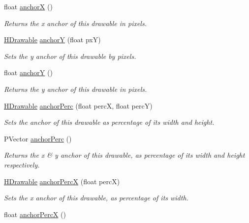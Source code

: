 \begin{DoxyCompactItemize}
float \hyperlink{classhype_1_1drawable_1_1_h_drawable_a5eaf9532fac11c32781e75c0c5c10912}{anchor\-X} ()
\begin{DoxyCompactList}\small\item\em Returns the x anchor of this drawable in pixels. \end{DoxyCompactList}\item 
\hyperlink{classhype_1_1drawable_1_1_h_drawable}{H\-Drawable} \hyperlink{classhype_1_1drawable_1_1_h_drawable_a5f01745bf4fbd08a6740144cf5845da5}{anchor\-Y} (float px\-Y)
\begin{DoxyCompactList}\small\item\em Sets the y anchor of this drawable by pixels. \end{DoxyCompactList}\item 
float \hyperlink{classhype_1_1drawable_1_1_h_drawable_aed21ff57386ffdc3266ff7721bcfe3e3}{anchor\-Y} ()
\begin{DoxyCompactList}\small\item\em Returns the y anchor of this drawable in pixels. \end{DoxyCompactList}\item 
\hyperlink{classhype_1_1drawable_1_1_h_drawable}{H\-Drawable} \hyperlink{classhype_1_1drawable_1_1_h_drawable_a481f398231c8da57560e463ce6c5b5db}{anchor\-Perc} (float perc\-X, float perc\-Y)
\begin{DoxyCompactList}\small\item\em Sets the anchor of this drawable as percentage of its width and height. \end{DoxyCompactList}\item 
P\-Vector \hyperlink{classhype_1_1drawable_1_1_h_drawable_af1e613803f084a5df438b124878444f9}{anchor\-Perc} ()
\begin{DoxyCompactList}\small\item\em Returns the x \& y anchor of this drawable, as percentage of its width and height respectively. \end{DoxyCompactList}\item 
\hyperlink{classhype_1_1drawable_1_1_h_drawable}{H\-Drawable} \hyperlink{classhype_1_1drawable_1_1_h_drawable_a78ae3773359b55e8a84df8319fd72f20}{anchor\-Perc\-X} (float perc\-X)
\begin{DoxyCompactList}\small\item\em Sets the x anchor of this drawable, as percentage of its width. \end{DoxyCompactList}\item 
float \hyperlink{classhype_1_1drawable_1_1_h_drawable_a4c0158fa8194cfe3424714f16e700b5e}{anchor\-Perc\-X} ()

\end{DoxyCompactItemize}
